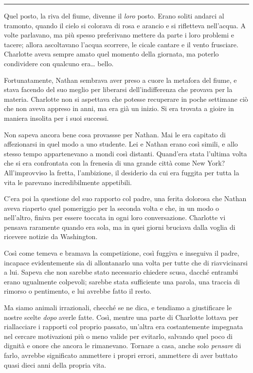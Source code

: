 \documentclass[a4paper,oneside,11pt]{memoir}
\begin{document}
\plainbreak{1}

Quel posto, la riva del fiume, divenne il \emph{loro} posto. Erano soliti andarci al tramonto, quando il cielo si
colorava di rosa e arancio e si rifletteva nell'acqua. A volte parlavano, ma più spesso preferivano mettere da parte i
loro problemi e tacere; allora ascoltavano l'acqua scorrere, le cicale cantare e il vento frusciare. Charlotte aveva
sempre amato quel momento della giornata, ma poterlo condividere con qualcuno era\dots{} bello.

Fortunatamente, Nathan sembrava aver preso a cuore la metafora del fiume, e stava facendo del suo meglio per liberarsi
dell'indifferenza che provava per la materia. Charlotte non si aspettava che potesse recuperare in poche settimane ciò
che non aveva appreso in anni, ma era già un inizio. Si era trovata a gioire in maniera insolita per i suoi successi.

Non sapeva ancora bene cosa provassse per Nathan. Mai le era capitato di affezionarsi in quel modo a uno studente. Lei e
Nathan erano così simili, e allo stesso tempo appartenevano a mondi così distanti. Quand'era stata l'ultima volta che si
era confrontata con la frenesia di una grande città come New York? All'improvviso la fretta, l'ambizione, il desiderio
da cui era fuggita per tutta la vita le parevano incredibilmente appetibili.

C'era poi la questione del suo rapporto col padre, una ferita dolorosa che Nathan aveva riaperto quel pomeriggio per la
seconda volta e che, in un modo o nell'altro, finiva per essere toccata in ogni loro conversazione. Charlotte vi pensava
raramente quando era sola, ma in quei giorni bruciava dalla voglia di ricevere notizie da Washington.

Così come temeva e bramava la competizione, così fuggiva e inseguiva il padre, incapace evidentemente sia di
allontanarlo una volta per tutte che di riavvicinarsi a lui. Sapeva che non sarebbe stato necessario chiedere scusa,
dacché entrambi erano ugualmente colpevoli; sarebbe stata sufficiente una parola, una traccia di rimorso o pentimento, e
lui avrebbe fatto il resto.

Ma siamo animali irrazionali, checché se ne dica, e tendiamo a giustificare le nostre scelte \emph{dopo} averle fatte.
Così, mentre una parte di Charlotte lottava per riallacciare i rapporti col proprio passato, un'altra era costantemente
impegnata nel cercare motivazioni più o meno valide per evitarlo, salvando quel poco di dignità e onore che ancora le
rimanevano. Tornare a casa, anche solo \emph{pensare} di farlo, avrebbe significato ammettere i propri errori, ammettere
di aver buttato quasi dieci anni della propria vita.
\end{document}
